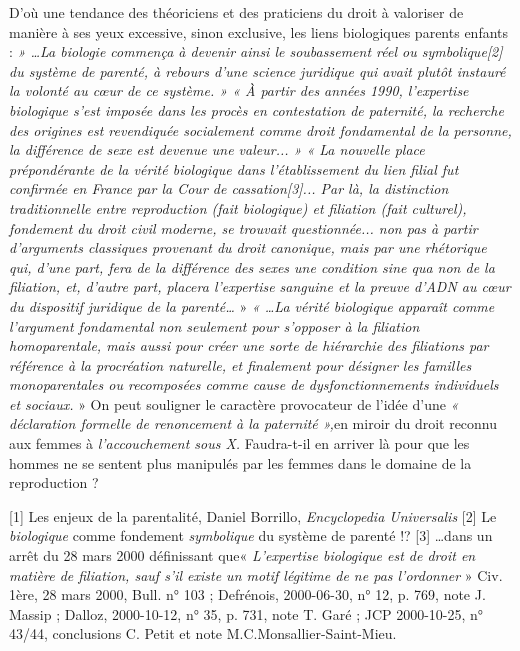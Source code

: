  D'où une tendance des théoriciens et des praticiens du droit à valoriser de manière à ses yeux excessive, sinon exclusive, les liens biologiques parents enfants : \emph{ » …La biologie commença à devenir ainsi le soubassement réel ou symbolique[2] du système de parenté, à rebours d'une science juridique qui avait plutôt instauré la volonté au cœur de ce système. » « À partir des années 1990, l'expertise biologique s'est imposée dans les procès en contestation de paternité, la recherche des origines est revendiquée socialement comme droit fondamental de la personne, la différence de sexe est devenue une valeur... » « La nouvelle place prépondérante de la vérité biologique dans l'établissement du lien filial fut confirmée en France par la Cour de cassation[3]... Par là, la distinction traditionnelle entre reproduction (fait biologique) et filiation (fait culturel), fondement du droit civil moderne, se trouvait questionnée... non pas à partir d'arguments classiques provenant du droit canonique, mais par une rhétorique qui, d'une part, fera de la différence des sexes une condition sine qua non de la filiation, et, d'autre part, placera l'expertise sanguine et la preuve d'ADN au cœur du dispositif juridique de la parenté…} » 
 \emph{« …La vérité biologique apparaît comme l'argument fondamental non seulement pour s'opposer à la filiation homoparentale, mais aussi pour créer une sorte de hiérarchie des filiations par référence à la procréation naturelle, et finalement pour désigner les familles monoparentales ou recomposées comme cause de dysfonctionnements individuels et sociaux.} »
 On peut souligner le caractère provocateur de l'idée d'une\emph{ « déclaration formelle de renoncement à la paternité »,}en miroir du droit reconnu aux femmes à \emph{l'accouchement sous X.}
 Faudra-t-il en arriver là pour que les hommes ne se sentent plus manipulés par les femmes dans le domaine de la reproduction ?
 
[1] Les enjeux de la parentalité, Daniel Borrillo, \emph{Encyclopedia Universalis}
[2] Le \emph{biologique} comme fondement \emph{symbolique} du système de parenté !?
[3] …dans un arrêt du 28 mars 2000 définissant que\emph{}« \emph{L'expertise biologique est de droit en matière de filiation, sauf s'il existe un motif légitime de ne pas l'ordonner} » Civ. 1ère, 28 mars 2000, Bull. n° 103 ; Defrénois, 2000-06-30, n° 12, p. 769, note J. Massip ; Dalloz, 2000-10-12, n° 35, p. 731, note T. Garé ; JCP 2000-10-25, n° 43/44, conclusions C. Petit et note M.C.Monsallier-Saint-Mieu.